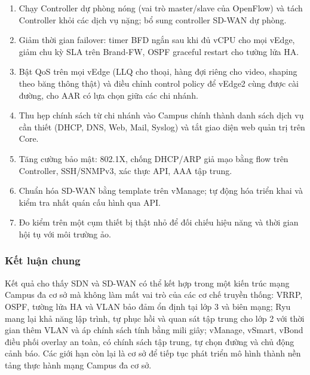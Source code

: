\begin{enumerate}
    \item Chạy Controller dự phòng nóng (vai trò master/slave của OpenFlow) và tách Controller khỏi các dịch vụ nặng; bổ sung controller SD-WAN dự phòng.
    \item Giảm thời gian failover: timer BFD ngắn sau khi đủ vCPU cho mọi vEdge, giảm chu kỳ SLA trên Brand-FW, OSPF graceful restart cho tường lửa HA.
    \item Bật QoS trên mọi vEdge (LLQ cho thoại, hàng đợi riêng cho video, shaping theo băng thông thật) và điều chỉnh control policy để vEdge2 cùng được cài đường, cho AAR có lựa chọn giữa các chi nhánh.
    \item Thu hẹp chính sách từ chi nhánh vào Campus chính thành danh sách dịch vụ cần thiết (DHCP, DNS, Web, Mail, Syslog) và tắt giao diện web quản trị trên Core.
    \item Tăng cường bảo mật: 802.1X, chống DHCP/ARP giả mạo bằng flow trên Controller, SSH/SNMPv3, xác thực API, AAA tập trung.
    \item Chuẩn hóa SD-WAN bằng template trên vManage; tự động hóa triển khai và kiểm tra nhất quán cấu hình qua API.
    \item Đo kiểm trên một cụm thiết bị thật nhỏ để đối chiếu hiệu năng và thời gian hội tụ với môi trường ảo.
\end{enumerate}

\subsubsection{Kết luận chung}

Kết quả cho thấy SDN và SD-WAN có thể kết hợp trong một kiến trúc mạng Campus đa cơ sở mà không làm mất vai trò của các cơ chế truyền thống: VRRP, OSPF, tường lửa HA và VLAN bảo đảm ổn định tại lớp 3 và biên mạng; Ryu mang lại khả năng lập trình, tự phục hồi và quan sát tập trung cho lớp 2 với thời gian thêm VLAN và áp chính sách tính bằng mili giây; vManage, vSmart, vBond điều phối overlay an toàn, có chính sách tập trung, tự chọn đường và chủ động cảnh báo. Các giới hạn còn lại là cơ sở để tiếp tục phát triển mô hình thành nền tảng thực hành mạng Campus đa cơ sở.
